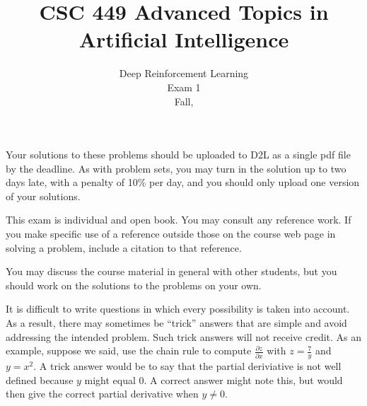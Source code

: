 \documentclass[12pt]{exam}
\title{CSC 449 Advanced Topics in Artificial Intelligence}
\date{Deep Reinforcement Learning\\Exam 1\\Fall, \the\year}
\begin{document}
\maketitle

Your solutions to these problems should be uploaded to D2L as a single
pdf file by the deadline. As with problem sets, you may turn in the
solution up to two days late, with a penalty of 10\% per day, and you
should only upload one version of your solutions.

This exam is individual and open book. You may consult any reference
work. If you make specific use of a reference outside those on the
course web page in solving a problem, include a citation to that
reference.


You may discuss the course material in general with other students,
but you should work on the solutions to the problems on your own.


It is difficult to write questions in
which every possibility is taken into account. As a result, there may sometimes
be ``trick'' answers that are simple and avoid addressing the
intended problem. Such trick answers will not receive credit. As an
example, suppose we said, use the chain rule to compute $\frac{\partial z}{\partial x}$ with $z =
\frac{7}{y}$ and $y = x^2$. A trick answer would be to say that the partial
deriviative is not well defined because $y$ might equal $0$. A correct
answer might note this, but would then give the correct partial
derivative when $y \ne 0$.

\newlength{\mytabcolsep}
\setlength{\mytabcolsep}{0.75pt}
\newlength{\zerowidth}
\settowidth{\zerowidth}{0}
\newlength{\normaltabcolsep}
\setlength{\normaltabcolsep}{\tabcolsep}
\end{document}
